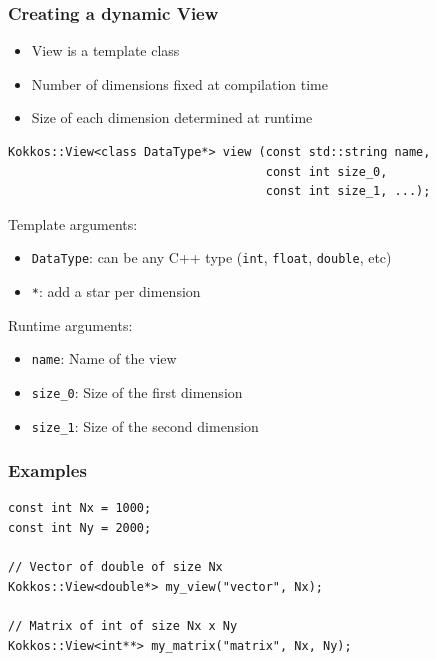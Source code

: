 \documentclass[aspectratio=169]{beamer}
\begin{document}
\begin{frame}[fragile]
    \frametitle{Creating a dynamic View}

\begin{itemize}
    \item View is a template class
    \item Number of dimensions fixed at compilation time
    \item Size of each dimension determined at runtime
\end{itemize}

\footnotesize
\begin{verbatim}
Kokkos::View<class DataType*> view (const std::string name, 
                                    const int size_0, 
                                    const int size_1, ...);
\end{verbatim}

Template arguments:

\begin{itemize}
    \item \texttt{DataType}: can be any C++ type (\texttt{int}, \texttt{float}, \texttt{double}, etc)
    \item \texttt{*}: add a star per dimension
\end{itemize}

Runtime arguments:

\begin{itemize}
    \item \texttt{name}: Name of the view
    \item \texttt{size\_0}: Size of the first dimension
    \item \texttt{size\_1}: Size of the second dimension
\end{itemize}


\end{frame}


\begin{frame}[fragile]
    \frametitle{Examples}

\small
\begin{verbatim}
const int Nx = 1000;
const int Ny = 2000;

// Vector of double of size Nx
Kokkos::View<double*> my_view("vector", Nx);

// Matrix of int of size Nx x Ny
Kokkos::View<int**> my_matrix("matrix", Nx, Ny);
\end{verbatim}

\end{frame} 
\end{document}
